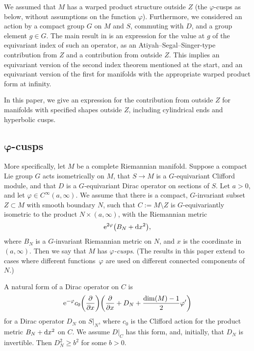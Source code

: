 \documentclass[10pt,a4paper]{amsart}
\numberwithin{equation}{section}
\begin{document}
We assumed that $M$ has a warped product structure outside $Z$ (the $\varphi$-cusps as below, without assumptions on the function $\varphi$).
Furthermore, we considered an action by a compact group $G$ on $M$ and $S$, commuting with $D$, and a group element $g \in G$. The main result in \cite{HW21a} is an expression for the value at $g$ of the equivariant index of such an operator, as an Atiyah--Segal--Singer-type contribution from $Z$ and a contribution from outside $Z$. This implies an equivariant version of the second index theorem mentioned at the start, and an equivariant version of the first for manifolds with the appropriate warped product form at infinity.

In this paper, we give an expression for the contribution from outside $Z$ for manifolds with specified shapes outside $Z$, including cylindrical ends and hyperbolic cusps.

\subsection*{$\boldsymbol\varphi$-cusps}

More specifically, let $M$ be a complete Riemannian manifold. Suppose a compact Lie group $G$ acts isometrically on $M$, that $S \to M$ is a $G$-equivariant Clifford module, and that $D$ is a $G$-equivariant Dirac operator on sections of $S$.
Let $a>0$, and let $\varphi \in C^{\infty}(a, \infty)$. We assume that there is a compact, $G$-invariant subset $Z \subset M$ with smooth boundary $N$, such that $C := M \setminus Z$ is $G$-equivariantly isometric to the product $N \times (a, \infty)$, with the Riemannian metric
\begin{equation*} %
{\rm e}^{2\varphi}\big(B_N + {\rm d}x^2\big),
\end{equation*}
where $B_N$ is a $G$-invariant Riemannian metric on $N$, and $x$ is the coordinate in $(a, \infty)$. Then we say that $M$ has \emph{$\varphi$-cusps}. (The results in this paper extend to cases where different functions~$\varphi$ are used on different connected components of $N$.)

A natural form of a Dirac operator on $C$ is
\[
{\rm e}^{-\varphi} c_0\bigg(\frac{\partial}{\partial x} \bigg)\bigg(\frac{\partial}{\partial x}+D_N +\frac{\dim(M)-1}{2}\varphi' \bigg)
\]
for a Dirac operator $D_N$ on $S|_N$, where $c_0$ is the Clifford action for the product metric
$B_N + {\rm d}x^2$ on $C$. We assume $D|_C$ has this form, and, initially, that $D_N$ is invertible. Then $D_N^2 \geq b^2$ for some $b>0$.
\end{document}
